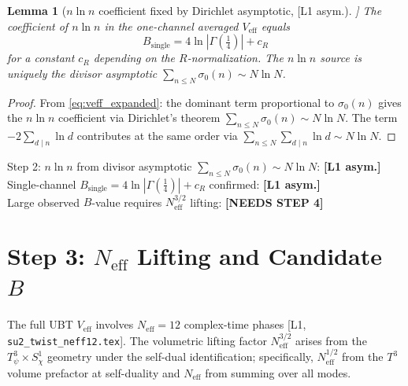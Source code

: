 \documentclass[12pt,a4paper]{article}
\newtheorem{lemma}[theorem]{Lemma}
\begin{document}
\begin{lemma}[$n\ln n$ coefficient fixed by Dirichlet asymptotic, [L1 asym.]]
\label{lem:nlogn}
The coefficient of $n\ln n$ in the one-channel averaged $V_{\mathrm{eff}}$
equals
\[
B_{\mathrm{single}} = 4\ln|\Gamma({\tfrac14})| + c_R
\]
for a constant $c_R$ depending on the $R$-normalization.
The $n\ln n$ source is uniquely the divisor asymptotic $\sum_{n\leq N}\sigma_0(n)\sim N\ln N$.
\end{lemma}

\begin{proof}
From \eqref{eq:veff_expanded}: the dominant term proportional to $\sigma_0(n)$
gives the $n\ln n$ coefficient via Dirichlet's theorem
$\sum_{n\leq N}\sigma_0(n) \sim N\ln N$.
The term $-2\sum_{d\mid n}\ln d$ contributes at the same order via
$\sum_{n\leq N}\sum_{d\mid n}\ln d \sim N\ln N$.
\end{proof}

\begin{statusbox}
Step 2: $n\ln n$ from divisor asymptotic $\sum_{n\leq N}\sigma_0(n)\sim N\ln N$: \textbf{[L1 asym.]}\\
Single-channel $B_{\mathrm{single}} = 4\ln|\Gamma(\tfrac14)| + c_R$ confirmed: \textbf{[L1 asym.]}\\
Large observed $B$-value requires $N_{\mathrm{eff}}^{3/2}$ lifting: \textbf{[NEEDS STEP 4]}
\end{statusbox}

\section{Step 3: $N_{\mathrm{eff}}$ Lifting and Candidate $B$}
\label{sec:step3}

The full UBT $V_{\mathrm{eff}}$ involves $N_{\mathrm{eff}} = 12$ complex-time
phases [L1, \texttt{su2\_twist\_neff12.tex}].  The volumetric lifting factor
$N_{\mathrm{eff}}^{3/2}$ arises from the $T^3_\psi\times S^1_\chi$ geometry
under the self-dual identification; specifically, $N_{\mathrm{eff}}^{1/2}$ from
the $T^3$ volume prefactor at self-duality and $N_{\mathrm{eff}}$ from summing
over all modes.
\end{document}

